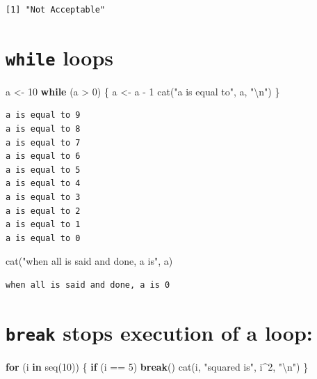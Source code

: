 \documentclass[
]{book}
\newenvironment{Shaded}{\begin{snugshade}}{\end{snugshade}}
\newcommand{\ControlFlowTok}[1]{\textcolor[rgb]{0.13,0.29,0.53}{\textbf{#1}}}
\newcommand{\DecValTok}[1]{\textcolor[rgb]{0.00,0.00,0.81}{#1}}
\newcommand{\FunctionTok}[1]{\textcolor[rgb]{0.00,0.00,0.00}{#1}}
\newcommand{\NormalTok}[1]{#1}
\newcommand{\OtherTok}[1]{\textcolor[rgb]{0.56,0.35,0.01}{#1}}
\newcommand{\SpecialCharTok}[1]{\textcolor[rgb]{0.00,0.00,0.00}{#1}}
\newcommand{\StringTok}[1]{\textcolor[rgb]{0.31,0.60,0.02}{#1}}
\begin{document}
\begin{verbatim}
[1] "Not Acceptable"
\end{verbatim}

\hypertarget{while-loops}{%
\section{\texorpdfstring{\texttt{while} loops}{while loops}}\label{while-loops}}

\begin{Shaded}
\begin{Highlighting}[]
\NormalTok{a }\OtherTok{\textless{}{-}} \DecValTok{10}
\ControlFlowTok{while}\NormalTok{ (a }\SpecialCharTok{\textgreater{}} \DecValTok{0}\NormalTok{) \{}
\NormalTok{  a }\OtherTok{\textless{}{-}}\NormalTok{ a }\SpecialCharTok{{-}} \DecValTok{1}
  \FunctionTok{cat}\NormalTok{(}\StringTok{"a is equal to"}\NormalTok{, a, }\StringTok{"}\SpecialCharTok{\textbackslash{}n}\StringTok{"}\NormalTok{)}
\NormalTok{\}}
\end{Highlighting}
\end{Shaded}

\begin{verbatim}
a is equal to 9 
a is equal to 8 
a is equal to 7 
a is equal to 6 
a is equal to 5 
a is equal to 4 
a is equal to 3 
a is equal to 2 
a is equal to 1 
a is equal to 0 
\end{verbatim}

\begin{Shaded}
\begin{Highlighting}[]
\FunctionTok{cat}\NormalTok{(}\StringTok{"when all is said and done, a is"}\NormalTok{, a)}
\end{Highlighting}
\end{Shaded}

\begin{verbatim}
when all is said and done, a is 0
\end{verbatim}

\hypertarget{break-stops-execution-of-a-loop}{%
\section{\texorpdfstring{\texttt{break} stops execution of a loop:}{break stops execution of a loop:}}\label{break-stops-execution-of-a-loop}}

\begin{Shaded}
\begin{Highlighting}[]
\ControlFlowTok{for}\NormalTok{ (i }\ControlFlowTok{in} \FunctionTok{seq}\NormalTok{(}\DecValTok{10}\NormalTok{)) \{}
  \ControlFlowTok{if}\NormalTok{ (i }\SpecialCharTok{==} \DecValTok{5}\NormalTok{) }\ControlFlowTok{break}\NormalTok{()}
  \FunctionTok{cat}\NormalTok{(i, }\StringTok{"squared is"}\NormalTok{, i}\SpecialCharTok{\^{}}\DecValTok{2}\NormalTok{, }\StringTok{"}\SpecialCharTok{\textbackslash{}n}\StringTok{"}\NormalTok{)}
\NormalTok{\}}
\end{Highlighting}
\end{Shaded}
\end{document}
